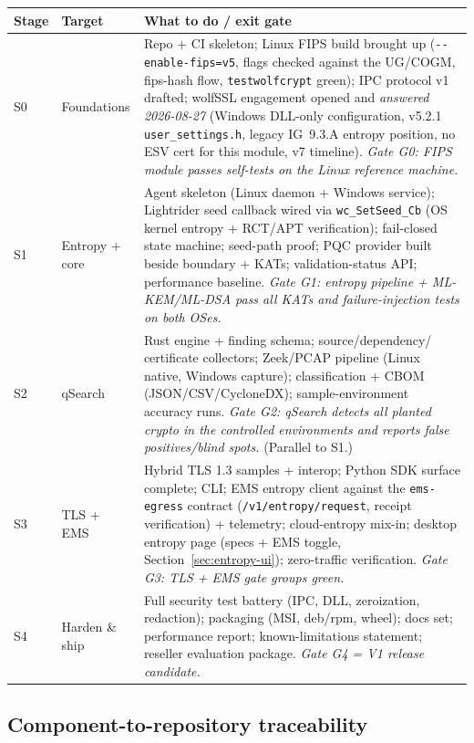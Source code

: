 \documentclass[10pt]{article}
\newcommand{\code}[1]{\texttt{\small #1}}
\begin{document}
\begin{small}
\begin{tabularx}{\textwidth}{@{}llL@{}}
\toprule
\textbf{Stage} & \textbf{Target} & \textbf{What to do / exit gate} \\
\midrule
S0 & Foundations & Repo + CI skeleton; Linux FIPS build brought up
  (\code{-{}-enable-fips=v5}, flags checked against the UG/COGM, fips-hash flow,
  \code{testwolfcrypt} green); IPC protocol v1 drafted; wolfSSL engagement opened and
  \emph{answered 2026-08-27} (Windows DLL-only configuration, v5.2.1
  \code{user\_settings.h}, legacy IG~9.3.A entropy position, no ESV cert for this
  module, v7 timeline).
  \emph{Gate G0: FIPS module passes self-tests on the Linux reference machine.} \\
S1 & Entropy + core & Agent skeleton (Linux daemon + Windows
  service); Lightrider seed callback wired via \code{wc\_SetSeed\_Cb} (OS kernel entropy
  + RCT/APT verification); fail-closed state machine; seed-path proof;
  PQC provider built beside boundary + KATs; validation-status API; performance baseline.
  \emph{Gate G1: entropy pipeline + ML-KEM/ML-DSA pass all KATs and failure-injection
  tests on both OSes.} \\
S2 & qSearch & Rust engine + finding schema; source/dependency/
  certificate collectors; Zeek/PCAP pipeline (Linux native, Windows capture);
  classification + CBOM (JSON/CSV/CycloneDX); sample-environment accuracy runs.
  \emph{Gate G2: qSearch detects all planted crypto in the controlled environments and
  reports false positives/blind spots.} (Parallel to S1.) \\
S3 & TLS + EMS & Hybrid TLS 1.3 samples + interop; Python SDK
  surface complete; CLI; EMS entropy client against the \code{ems-egress} contract
  (\code{/v1/entropy/request}, receipt verification) + telemetry; cloud-entropy mix-in;
  desktop entropy page (specs + EMS toggle, Section~\ref{sec:entropy-ui});
  zero-traffic verification. \emph{Gate G3: TLS + EMS gate groups green.} \\
S4 & Harden \& ship & Full security test battery (IPC, DLL, zeroization,
  redaction); packaging (MSI, deb/rpm, wheel); docs set; performance report;
  known-limitations statement; reseller evaluation package.
  \emph{Gate G4 = V1 release candidate.} \\
\bottomrule
\end{tabularx}
\end{small}

\subsection{Component-to-repository traceability}
\end{document}
